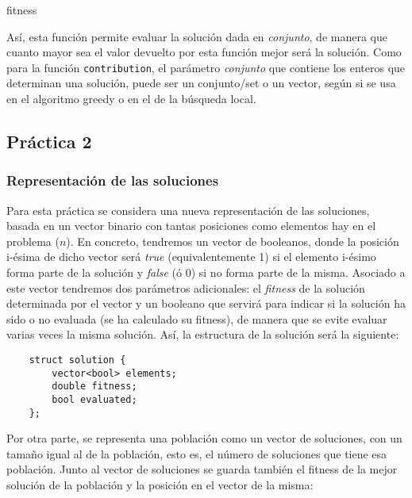 \documentclass[10pt,a4paper]{article}
\begin{document}
	\begin{algorithm}[H]
	\caption{\sc fitness}
	\end{algorithm}

	Así, esta función permite evaluar la solución dada en \textit{conjunto}, de manera que cuanto mayor sea el valor devuelto por esta función mejor será la solución. Como para la función \lstinline|contribution|, el parámetro \textit{conjunto} que contiene los enteros que determinan una solución, puede ser un conjunto/set o un vector, según si se usa en el algoritmo greedy o en el de la búsqueda local. 
	
	\subsection{Práctica 2}
	\subsubsection{Representación de las soluciones}
	Para esta práctica se considera una nueva representación de las soluciones, basada en un vector binario con tantas posiciones como elementos hay en el problema ($ n $). En concreto, tendremos un vector de booleanos, donde la posición i-ésima de dicho vector será \textit{true} (equivalentemente 1) si el elemento i-ésimo forma parte de la solución y \textit{false} (ó 0) si no forma parte de la misma. Asociado a este vector tendremos dos parámetros adicionales: el \textit{fitness} de la solución determinada por el vector y un booleano que servirá para indicar si la solución ha sido o no evaluada (se ha calculado su fitness), de manera que se evite evaluar varias veces la misma solución. Así, la estructura de la solución será la siguiente:
	
	\begin{lstlisting}
	struct solution {
		vector<bool> elements;
		double fitness;
		bool evaluated;
	};
	\end{lstlisting}
	
	Por otra parte, se representa una población como un vector de soluciones, con un tamaño igual al de la población, esto es, el número de soluciones que tiene esa población. Junto al vector de soluciones se guarda también el fitness de la mejor solución de la población y la posición en el vector de la misma:
	
\end{document}
